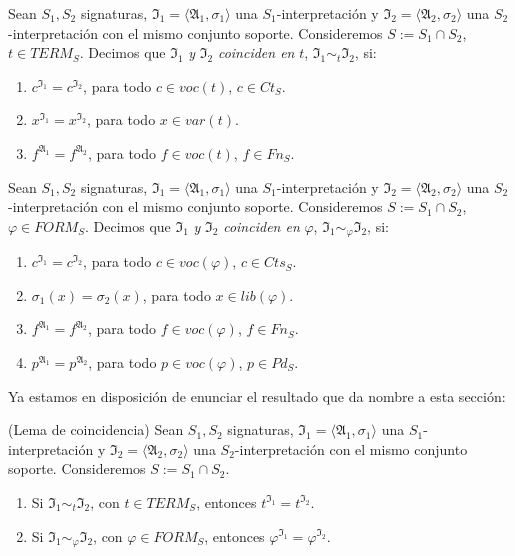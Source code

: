 \begin{definition}
Sean $S_1, S_2$ signaturas, $\mathfrak{I}_{1} = \langle \mathfrak{A}_1, \sigma_1 \rangle$ una $S_1$-interpretación y $\mathfrak{I}_{2} = \langle \mathfrak{A}_2, \sigma_2 \rangle$ una $S_2$-interpretación con el mismo conjunto soporte. Consideremos $S := S_1 \cap S_2$, $t \in TERM_S$. Decimos que $\mathfrak{I}_{1}$ \textit{y} $\mathfrak{I}_{2}$ \textit{coinciden en} $t$, $\mathfrak{I}_{1} \sim_{t} \mathfrak{I}_{2}$, si:
\begin{enumerate}
    \item $c^{\mathfrak{I}_{1}} = c^{\mathfrak{I}_{2}}$, para todo $c \in voc(t)$, $c \in Ct_S$.
    \item $x^{\mathfrak{I}_{1}} = x^{\mathfrak{I}_{2}}$, para todo $x \in var(t)$.
    \item $f^{\mathfrak{A}_{1}} = f^{\mathfrak{A}_{2}}$, para todo $f \in voc(t)$, $f \in Fn_S$.
\end{enumerate}
\end{definition}

\begin{definition}
Sean $S_1, S_2$ signaturas, $\mathfrak{I}_{1} = \langle \mathfrak{A}_1, \sigma_1 \rangle$ una $S_1$-interpretación y $\mathfrak{I}_{2} = \langle \mathfrak{A}_2, \sigma_2 \rangle$ una $S_2$-interpretación con el mismo conjunto soporte. Consideremos $S := S_1 \cap S_2$, $ \varphi \in FORM_S$. Decimos que $\mathfrak{I}_{1}$ \textit{y} $\mathfrak{I}_{2}$ \textit{coinciden en} $\varphi$, $\mathfrak{I}_{1} \sim_{\varphi} \mathfrak{I}_{2}$, si:
\begin{enumerate}
    \item $c^{\mathfrak{I}_{1}} = c^{\mathfrak{I}_{2}}$, para todo $c \in voc(\varphi)$, $c \in Cts_S$.
    \item $\sigma_1(x) = \sigma_2(x)$, para todo $x \in lib(\varphi)$.
    \item $f^{\mathfrak{A}_{1}} = f^{\mathfrak{A}_{2}}$, para todo $f \in voc(\varphi)$, $f \in Fn_S$.
    \item $p^{\mathfrak{A}_{1}} = p^{\mathfrak{A}_{2}}$, para todo $p \in voc(\varphi)$, $p \in Pd_S$.
\end{enumerate}
\end{definition}

Ya estamos en disposición de enunciar el resultado que da nombre a esta sección:
\begin{theorem}(Lema de coincidencia)\label{coinc}
Sean $S_1, S_2$ signaturas, $\mathfrak{I}_{1} = \langle \mathfrak{A}_1, \sigma_1 \rangle$ una $S_1$-interpretación y $\mathfrak{I}_{2} = \langle \mathfrak{A}_2, \sigma_2 \rangle$ una $S_2$-interpretación con el mismo conjunto soporte. Consideremos $S := S_1 \cap S_2$.
\begin{enumerate}
    \item Si $\mathfrak{I}_{1} \sim_{t} \mathfrak{I}_{2}$, con $t \in TERM_S$, entonces  $t^{\mathfrak{I}_{1}} = t^{\mathfrak{I}_{2}}$.
    \item Si $\mathfrak{I}_{1} \sim_{\varphi} \mathfrak{I}_{2}$, con $\varphi \in FORM_S$, entonces  $\varphi^{\mathfrak{I}_{1}} = \varphi^{\mathfrak{I}_{2}}$.
\end{enumerate}
\end{theorem}

